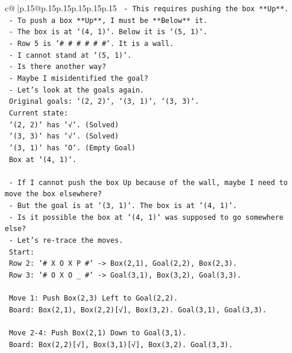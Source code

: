 \documentclass{article}
\begin{document}
{\begin{supertabular}{c@{$\;$}|p{.15\linewidth}@{}p{.15\linewidth}p{.15\linewidth}p{.15\linewidth}p{.15\linewidth}p{.15\linewidth}}
{{{\texttt{    {-} This requires pushing the box **Up**.} \\
\texttt{    {-} To push a box **Up**, I must be **Below** it.} \\
\texttt{    {-} The box is at `(4, 1)`. Below it is `(5, 1)`.} \\
\texttt{    {-} Row 5 is `\# \# \# \# \# \#`. It is a wall.} \\
\texttt{    {-} I cannot stand at `(5, 1)`.} \\
\texttt{    {-} Is there another way?} \\
\texttt{    {-} Maybe I misidentified the goal?} \\
\texttt{    {-} Let's look at the goals again.} \\
\texttt{      Original goals: `(2, 2)`, `(3, 1)`, `(3, 3)`.} \\
\texttt{      Current state:} \\
\texttt{      `(2, 2)` has `√`. (Solved)} \\
\texttt{      `(3, 3)` has `√`. (Solved)} \\
\texttt{      `(3, 1)` has `O`. (Empty Goal)} \\
\texttt{      Box at `(4, 1)`.} \\
\\ 
\texttt{    {-} If I cannot push the box Up because of the wall, maybe I need to move the box elsewhere?} \\
\texttt{    {-} But the goal is at `(3, 1)`. The box is at `(4, 1)`.} \\
\texttt{    {-} Is it possible the box at `(4, 1)` was supposed to go somewhere else?} \\
\texttt{    {-} Let's re{-}trace the moves.} \\
\texttt{      Start:} \\
\texttt{      Row 2: `\# X O X P \#` {-}> Box(2,1), Goal(2,2), Box(2,3).} \\
\texttt{      Row 3: `\# O X O \_ \#` {-}> Goal(3,1), Box(3,2), Goal(3,3).} \\
\\ 
\texttt{      Move 1: Push Box(2,3) Left to Goal(2,2).} \\
\texttt{      Board: Box(2,1), Box(2,2){[}√{]}, Box(3,2). Goal(3,1), Goal(3,3).} \\
\\ 
\texttt{      Move 2{-}4: Push Box(2,1) Down to Goal(3,1).} \\
\texttt{      Board: Box(2,2){[}√{]}, Box(3,1){[}√{]}, Box(3,2). Goal(3,3).} \\
}}}
\end{supertabular}}
\end{document}
